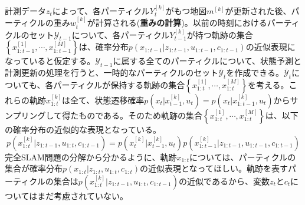 \documentclass[dvipdfmx,a4paper]{jsarticle}
\begin{document}
計測データ$z_t$によって、各パーティクル$Y_t^{[k]}$がもつ地図$m^{[k]}$が更新された後、パーティクルの重み$w_t^{[k]}$が計算される(\textbf{重みの計算})。以前の時刻におけるパーティクルのセット$\mathcal{Y}_{t - 1}$について、各パーティクル$Y_{t - 1}^{[k]}$が持つ軌跡の集合$\left\{ x_{1 : t - 1}^{[1]}, \cdots, x_{1 : t - 1}^{[M]} \right\}$は、確率分布$p(x_{1 : t - 1} | z_{1 : t - 1}, u_{1 : t - 1}, c_{1 : t - 1})$の近似表現になっていると仮定する。$\mathcal{Y}_{t - 1}$に属する全てのパーティクルについて、状態予測と計測更新の処理を行うと、一時的なパーティクルのセット$\overline{\mathcal{Y}}_t$を作成できる。$\overline{\mathcal{Y}}_t$についても、各パーティクルが保持する軌跡の集合$\left\{ x_{1 : t}^{[1]}, \cdots, x_{1 : t}^{[M]} \right\}$を考える。これらの軌跡$x_{1 : t}^{[k]}$は全て、状態遷移確率$p(x_t | x_{t - 1}^{[k]}, u_t) = p(x_t | x_{1 : t - 1}^{[k]}, u_t)$からサンプリングして得たものである。そのため軌跡の集合$\left\{ x_{1 : t}^{[1]}, \cdots, x_{1 : t}^{[M]} \right\}$は、以下の確率分布の近似的な表現となっている。
\begin{equation}
	p(x_{1 : t}^{[k]} | z_{1 : t - 1}, u_{1 : t}, c_{1 : t - 1}) = p(x_t^{[k]} | x_{t - 1}^{[k]}, u_t) p(x_{1 : t - 1}^{[k]} | z_{1 : t - 1}, u_{1 : t - 1}, c_{1 : t - 1})
\end{equation}
完全SLAM問題の分解から分かるように、軌跡$x_{1 : t}$については、パーティクルの集合が確率分布$p(x_{1 : t} | z_{1 : t}, u_{1 : t}, c_{1 : t})$の近似表現となってほしい。軌跡を表すパーティクルの集合は$p(x_{1 : t}^{[k]} | z_{1 : t - 1}, u_{1 : t}, c_{1 : t - 1})$の近似であるから、変数$z_t$と$c_t$についてはまだ考慮されていない。
\end{document}
